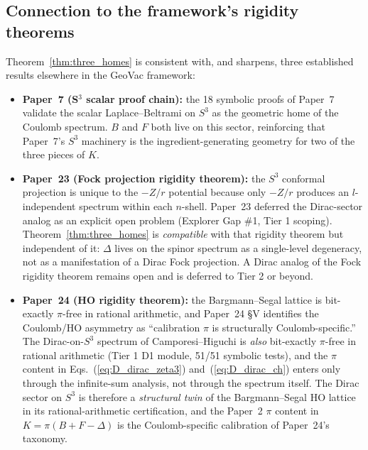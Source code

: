 \documentclass[aps,prl,twocolumn,superscriptaddress]{revtex4-2}
\begin{document}
\subsection{Connection to the framework's rigidity theorems}\label{sec:rigidity_connection}

Theorem~\ref{thm:three_homes} is consistent with, and sharpens, three
established results elsewhere in the GeoVac framework:

\begin{itemize}
  \item \textbf{Paper~7 (S$^{3}$ scalar proof chain):} the 18 symbolic
    proofs of Paper~7 validate the scalar Laplace--Beltrami on $S^{3}$
    as the geometric home of the Coulomb spectrum. $B$ and $F$ both
    live on this sector, reinforcing that Paper~7's $S^{3}$ machinery
    is the ingredient-generating geometry for two of the three pieces
    of $K$.
  \item \textbf{Paper~23 (Fock projection rigidity theorem):} the $S^{3}$
    conformal projection is unique to the $-Z/r$ potential because only
    $-Z/r$ produces an $l$-independent spectrum within each $n$-shell.
    Paper~23 deferred the Dirac-sector analog as an explicit open
    problem (Explorer Gap \#1, Tier 1 scoping). Theorem~\ref{thm:three_homes}
    is \emph{compatible} with that rigidity theorem but independent of
    it: $\Delta$ lives on the spinor spectrum as a single-level
    degeneracy, not as a manifestation of a Dirac Fock projection.
    A Dirac analog of the Fock rigidity theorem remains open and is
    deferred to Tier 2 or beyond.
  \item \textbf{Paper~24 (HO rigidity theorem):} the Bargmann--Segal
    lattice is bit-exactly $\pi$-free in rational arithmetic, and
    Paper~24 \S V identifies the Coulomb/HO asymmetry as ``calibration
    $\pi$ is structurally Coulomb-specific.'' The Dirac-on-$S^{3}$
    spectrum of Camporesi--Higuchi is \emph{also} bit-exactly $\pi$-free
    in rational arithmetic (Tier 1 D1 module, 51/51 symbolic tests),
    and the $\pi$ content in Eqs.~(\ref{eq:D_dirac_zeta3})
    and~(\ref{eq:D_dirac_ch}) enters only through the infinite-sum
    analysis, not through the spectrum itself. The Dirac sector on
    $S^{3}$ is therefore a \emph{structural twin} of the
    Bargmann--Segal HO lattice in its rational-arithmetic certification,
    and the Paper~2 $\pi$ content in $K = \pi(B + F - \Delta)$ is the
    Coulomb-specific calibration of Paper~24's taxonomy.
\end{itemize}
\end{document}
